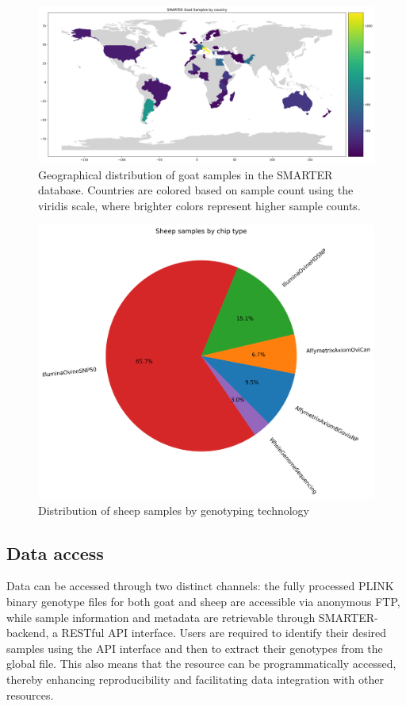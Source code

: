 \documentclass[a4paper,num-refs,gigabyte]{oup-contemporary}
\begin{document}
\begin{figure}
\centering
\includegraphics[width=.95\textwidth]{goat-by-country.png}
\caption{Geographical distribution of goat samples in the SMARTER database. Countries are colored based on sample count using the viridis scale, where brighter colors represent higher sample counts.}
\label{fig:goat_samples}
\end{figure}

\begin{figure}
\centering
\includegraphics[width=.45\textwidth]{sheep-samples-by-chip-type.png}
\caption{Distribution of sheep samples by genotyping technology}
\label{fig:sheep_technology}
\end{figure}

\subsection{Data access}

Data can be accessed through two distinct channels: the fully processed PLINK binary genotype files for both goat and sheep are accessible via anonymous FTP, while sample information and metadata are retrievable through SMARTER-backend\citep{SMARTERAPI}, a RESTful API interface\citep{REST}. Users are required to identify their desired samples using the API interface and then to extract their genotypes from the global file. This also means that the resource can be programmatically accessed, thereby enhancing reproducibility and facilitating data integration with other resources.
\end{document}

